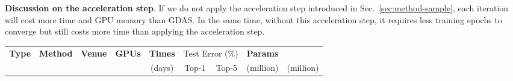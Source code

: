 \documentclass[10pt,twocolumn,letterpaper]{article}
\def\Secref#1{Sec.~\ref{#1}}
\begin{document}
\textbf{Discussion on the acceleration step}. If we do not apply the acceleration step introduced in \Secref{sec:method-sample}, each iteration will cost  more time and GPU memory than GDAS. In the same time, without this acceleration step, it requires less training epochs to converge but still costs more time than applying the acceleration step.







\begin{table*}[t!]
\centering
\setlength{\tabcolsep}{4.5pt}
\begin{tabular}{| c | l | c | c | c | c | c | c | c |} \hline\hline

  \multirow{2}{*}{\textbf{Type}} &  \multirow{2}{*}{\textbf{Method}} & \multirow{2}{*}{\textbf{Venue}} & \multirow{2}{*}{\textbf{GPUs}} & \textbf{Times} & \multicolumn{2}{c|}{Test Error (\%)} & \textbf{Params} &   \\ \cline{6-7}
    &  & & & (days) & Top-1 & Top-5 & (million) & (million) \\ \hline


\end{tabular}
\end{table*}
\end{document}
